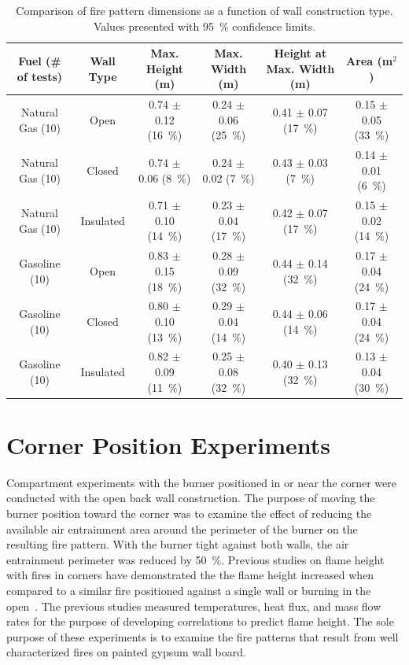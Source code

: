 \documentclass[twoside]{uocthesis}
\begin{document}
\begin{table}
	\centering
	\begin{tabular}{|c|c|c|c|c|c|}
	\hline
	Fuel (\# of tests)      &   Wall Type   &   Max. Height (m)	         & Max. Width (m)               &  Height at Max. Width (m) &  Area (m$^2$)  \\ \hline \hline
		Natural Gas (10)    &   Open 		& 0.74 	$\pm$ 0.12 (16~\%)   &	0.24 $\pm$ 0.06 (25~\%) 	& 0.41 $\pm$ 0.07 (17~\%)	& 0.15 $\pm$ 0.05 (33~\%) 	\\
		Natural Gas (10)    &   Closed 		& 0.74	$\pm$ 0.06 (8~\%)    &	0.24 $\pm$ 0.02 (7~\%) 		& 0.43 $\pm$ 0.03 (7~\%)  	& 0.14 $\pm$ 0.01 (6~\%) 	\\
		Natural Gas (10)    &   Insulated 	& 0.71	$\pm$ 0.10 (14~\%)   &	0.23 $\pm$ 0.04 (17~\%) 	& 0.42 $\pm$ 0.07 (17~\%) 	& 0.15 $\pm$ 0.02 (14~\%)  	\\
		Gasoline (10)       &   Open    	& 0.83	$\pm$ 0.15 (18~\%)   &	0.28 $\pm$ 0.09 (32~\%) 	& 0.44 $\pm$ 0.14 (32~\%) 	& 0.17 $\pm$ 0.04 (24~\%)  	\\
		Gasoline (10)       &   Closed  	& 0.80	$\pm$ 0.10 (13~\%)   &	0.29 $\pm$ 0.04 (14~\%) 	& 0.44 $\pm$ 0.06 (14~\%) 	& 0.17 $\pm$ 0.04 (24~\%)  	\\
		Gasoline (10)       &   Insulated	& 0.82 	$\pm$ 0.09 (11~\%)   &	0.25 $\pm$ 0.08 (32~\%) 	& 0.40 $\pm$ 0.13 (32~\%) 	& 0.13 $\pm$ 0.04 (30~\%)  	\\
		\hline
	\end{tabular}
	\caption[Comparison of fire pattern dimensions as a function of wall construction type]{Comparison of fire pattern dimensions as a function of wall construction type. Values presented with 95~\% confidence limits.}
	\label{tab:Fire_Pattern_Dimensions_Wall_Construction}
\end{table}


\section{Corner Position Experiments}

Compartment experiments with the burner positioned in or near the corner were conducted with the open back wall construction.  The purpose of moving the burner position toward the corner was to examine the effect of reducing the available air entrainment area around the perimeter of the burner on the resulting fire pattern.  With the burner tight against both walls, the air entrainment perimeter was reduced by 50~\%. Previous studies on flame height with fires in corners have demonstrated the the flame height increased when compared to a similar fire positioned against a single wall or burning in the open~\cite{Poreh:1999,Saito:1993,Takahashi:1997,Kokkala:1993}.  The previous studies measured temperatures, heat flux, and mass flow rates for the purpose of developing correlations to predict flame height. The sole purpose of these experiments is to examine the fire patterns that result from well characterized fires on painted gypsum wall board.       
\end{document}
